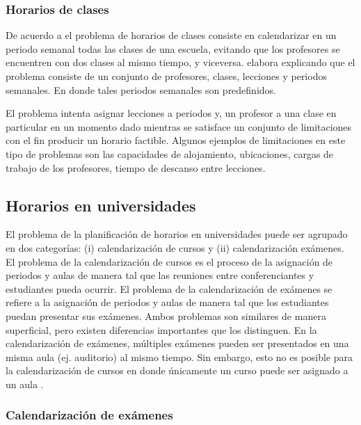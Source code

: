\documentclass[draft,12pt,headsepline,footsepline,paper=letter]{scrreprt}
\begin{document}
\subsubsection{Horarios de clases}

De acuerdo a \citet[p.~88]{schaerf99a-survey-of-automated} el problema de horarios de clases consiste en calendarizar en un periodo semanal todas las clases de una escuela, evitando que los profesores se encuentren con dos clases al mismo tiempo, y viceversa. \citet[p.~10,11]{abdullah06heuristic-approaches} elabora explicando que el problema consiste de un conjunto de profesores, clases, lecciones y periodos semanales. En donde tales periodos semanales son predefinidos.

El problema intenta asignar lecciones a periodos y, un profesor a una clase en particular en un momento dado mientras se satisface un conjunto de limitaciones con el fin producir un horario factible. Algunos ejemplos de limitaciones en este tipo de problemas son las capacidades de alojamiento, ubicaciones, cargas de trabajo de los profesores, tiempo de descanso entre lecciones.

\subsection{Horarios en universidades}

El problema de la planificación de horarios en universidades puede ser agrupado en dos categorías: (i) calendarización de cursos y (ii) calendarización exámenes.
El problema de la calendarización de cursos es el proceso de la asignación de periodos y aulas de manera tal que las reuniones entre conferenciantes y estudiantes pueda ocurrir.
El problema de la calendarización de exámenes se refiere a la asignación de periodos y aulas de manera tal que los estudiantes puedan presentar sus exámenes.
Ambos problemas son similares de manera superficial, pero existen diferencias importantes que los distinguen.
En la calendarización de exámenes, múltiples exámenes pueden ser presentados en una misma aula (ej. auditorio) al mismo tiempo.
Sin embargo, esto no es posible para la calendarización de cursos en donde únicamente un curso puede ser asignado a un aula \citep[p.~11]{abdullah06heuristic-approaches}.

\subsubsection{Calendarización de exámenes}
\end{document}

